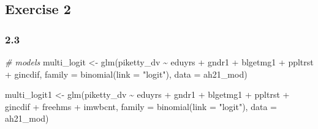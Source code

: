 \documentclass[
]{article}
\newenvironment{Shaded}{\begin{snugshade}}{\end{snugshade}}
\newcommand{\AttributeTok}[1]{\textcolor[rgb]{0.77,0.63,0.00}{#1}}
\newcommand{\CommentTok}[1]{\textcolor[rgb]{0.56,0.35,0.01}{\textit{#1}}}
\newcommand{\FunctionTok}[1]{\textcolor[rgb]{0.00,0.00,0.00}{#1}}
\newcommand{\NormalTok}[1]{#1}
\newcommand{\OtherTok}[1]{\textcolor[rgb]{0.56,0.35,0.01}{#1}}
\newcommand{\SpecialCharTok}[1]{\textcolor[rgb]{0.00,0.00,0.00}{#1}}
\newcommand{\StringTok}[1]{\textcolor[rgb]{0.31,0.60,0.02}{#1}}
\begin{document}
\hypertarget{exercise-2-1}{%
\subsection{Exercise 2}\label{exercise-2-1}}

\hypertarget{section-10}{%
\subsubsection{2.3}\label{section-10}}

\begin{Shaded}
\begin{Highlighting}[]
\CommentTok{\# models}
\NormalTok{multi\_logit }\OtherTok{\textless{}{-}} \FunctionTok{glm}\NormalTok{(piketty\_dv }\SpecialCharTok{\textasciitilde{}}\NormalTok{ eduyrs }\SpecialCharTok{+}\NormalTok{ gndr1 }\SpecialCharTok{+}\NormalTok{ blgetmg1 }\SpecialCharTok{+}\NormalTok{ ppltrst }\SpecialCharTok{+}\NormalTok{ gincdif, }
                   \AttributeTok{family =} \FunctionTok{binomial}\NormalTok{(}\AttributeTok{link =} \StringTok{"logit"}\NormalTok{),}
                   \AttributeTok{data =}\NormalTok{ ah21\_mod)}

\NormalTok{multi\_logit1 }\OtherTok{\textless{}{-}} \FunctionTok{glm}\NormalTok{(piketty\_dv }\SpecialCharTok{\textasciitilde{}}\NormalTok{ eduyrs }\SpecialCharTok{+}\NormalTok{ gndr1 }\SpecialCharTok{+}\NormalTok{ blgetmg1 }\SpecialCharTok{+}\NormalTok{ ppltrst }\SpecialCharTok{+} 
\NormalTok{                      gincdif }\SpecialCharTok{+}\NormalTok{ freehms }\SpecialCharTok{+}\NormalTok{ imwbcnt, }
                   \AttributeTok{family =} \FunctionTok{binomial}\NormalTok{(}\AttributeTok{link =} \StringTok{"logit"}\NormalTok{),}
                   \AttributeTok{data =}\NormalTok{ ah21\_mod)}


\end{Highlighting}
\end{Shaded}
\end{document}
